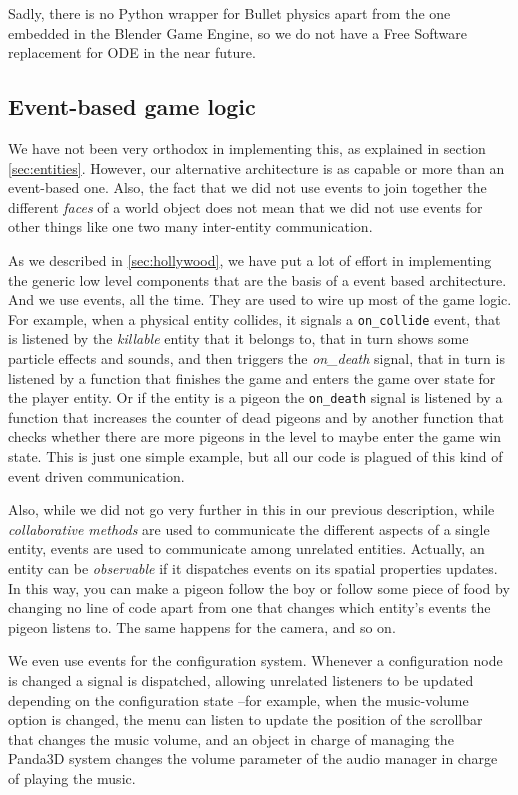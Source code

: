 \documentclass[a4paper,10pt]{article}
\begin{document}
Sadly, there is no Python wrapper for Bullet physics\cite{bulletphysics}
apart from the one embedded in the Blender Game Engine, so we do not
have a Free Software replacement for ODE in the near future.

\subsection{Event-based game logic}

We have not been very orthodox in implementing this, as explained in
section \ref{sec:entities}. However, our alternative architecture is
as capable or more than an event-based one. Also, the fact that we
did not use events to join together the different \emph{faces} of a world
object does not mean that we did not use events for other things like
one two many inter-entity communication.

As we described in \ref{sec:hollywood}, we have put a lot of effort in
implementing the generic low level components that are the basis of a
event based architecture. And we use events, all the time. They are
used to wire up most of the game logic. For example, when a physical
entity collides, it signals a \texttt{on\_collide} event, that is
listened by the \emph{killable} entity that it belongs to, that in
turn shows some particle effects and sounds, and then triggers the
\emph{on\_death} signal, that in turn is listened by a function that
finishes the game and enters the game over state for the player
entity. Or if the entity is a pigeon the \texttt{on\_death} signal is listened by a function that
increases the counter of dead pigeons and by another function that
checks whether there are more pigeons in the level to maybe enter the
game win state. This is just one simple example, but all our code is
plagued of this kind of event driven communication.

Also, while we did not go very further in this in our previous
description, while \emph{collaborative methods} are used to
communicate the different aspects of a single entity, events are used
to communicate among unrelated entities. Actually, an entity can be
\emph{observable} if it dispatches events on its spatial properties
updates. In this way, you can make a pigeon follow the boy or follow
some piece of food by changing no line of code apart from one that
changes which entity's events the pigeon listens to. The same happens
for the camera, and so on.

We even use events for the configuration system. Whenever a
configuration node is changed a signal is dispatched, allowing
unrelated listeners to be updated depending on the configuration state
--for example, when the music-volume option is changed, the menu can
listen to update the position of the scrollbar that changes the music
volume, and an object in charge of managing the Panda3D system changes
the volume parameter of the audio manager in charge of playing the
music.
\end{document}
